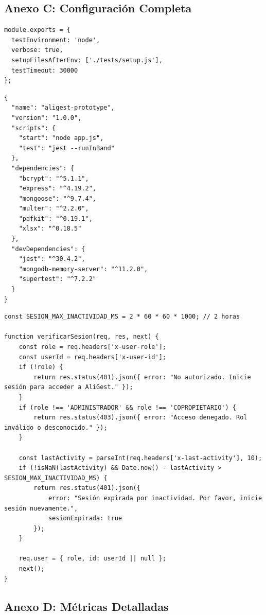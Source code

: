 \documentclass[12pt,a4paper]{article}
\begin{document}
\subsection*{Anexo C: Configuración Completa}

\begin{lstlisting}[caption={\texttt{jest.config.js}}]
module.exports = {
  testEnvironment: 'node',
  verbose: true,
  setupFilesAfterEnv: ['./tests/setup.js'],
  testTimeout: 30000
};
\end{lstlisting}

\begin{lstlisting}[caption={Fragmento relevante de \texttt{package.json}}]
{
  "name": "aligest-prototype",
  "version": "1.0.0",
  "scripts": {
    "start": "node app.js",
    "test": "jest --runInBand"
  },
  "dependencies": {
    "bcrypt": "^5.1.1",
    "express": "^4.19.2",
    "mongoose": "^9.7.4",
    "multer": "^2.2.0",
    "pdfkit": "^0.19.1",
    "xlsx": "^0.18.5"
  },
  "devDependencies": {
    "jest": "^30.4.2",
    "mongodb-memory-server": "^11.2.0",
    "supertest": "^7.2.2"
  }
}
\end{lstlisting}

\begin{lstlisting}[caption={Mecanismo de expiración de sesión por inactividad (RNF-01), \texttt{authMiddleware.js}}]
const SESION_MAX_INACTIVIDAD_MS = 2 * 60 * 60 * 1000; // 2 horas

function verificarSesion(req, res, next) {
    const role = req.headers['x-user-role'];
    const userId = req.headers['x-user-id'];
    if (!role) {
        return res.status(401).json({ error: "No autorizado. Inicie sesión para acceder a AliGest." });
    }
    if (role !== 'ADMINISTRADOR' && role !== 'COPROPIETARIO') {
        return res.status(403).json({ error: "Acceso denegado. Rol inválido o desconocido." });
    }

    const lastActivity = parseInt(req.headers['x-last-activity'], 10);
    if (!isNaN(lastActivity) && Date.now() - lastActivity > SESION_MAX_INACTIVIDAD_MS) {
        return res.status(401).json({
            error: "Sesión expirada por inactividad. Por favor, inicie sesión nuevamente.",
            sesionExpirada: true
        });
    }

    req.user = { role, id: userId || null };
    next();
}
\end{lstlisting}

\subsection*{Anexo D: Métricas Detalladas}
\end{document}

